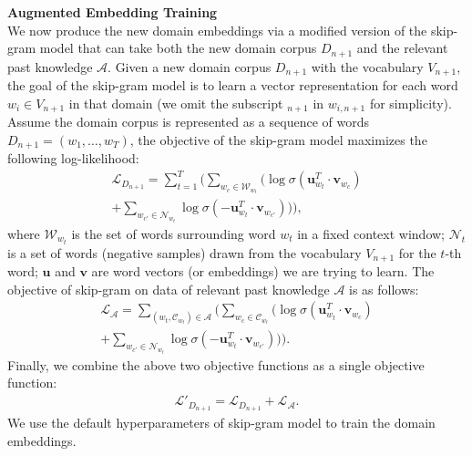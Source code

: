 \textbf{Augmented Embedding Training}\\
\label{chap3:sec:aet}
We now produce the new domain embeddings via a modified version of the skip-gram model \cite{mikolov2013distributed} that can take both the new domain corpus $D_{n+1}$ and the relevant past knowledge $\mathcal{A}$.
Given a new domain corpus $D_{n+1}$ with the vocabulary $V_{n+1}$, the goal of the skip-gram model is to learn a vector representation for each word $w_{i} \in V_{n+1}$ in that domain
(we omit the subscript $_{n+1}$ in $w_{i, n+1}$ for simplicity).
Assume the domain corpus is represented as a sequence of words $D_{n+1}=(w_1, \dots, w_T)$, the objective of the skip-gram model maximizes the following log-likelihood:
\begin{equation}
\label{chap3:eq:sg}
\begin{split}
\mathcal{L}_{D_{n+1}} =\sum_{t=1}^{T} \big( \sum_{w_c \in \mathcal{W}_{w_{t}} } \big(\log \sigma (\bm{u}_{w_t}^T\cdot \bm{v}_{w_c}) \\
+ \sum_{w_{c'} \in \mathcal{N}_{w_t} } \log \sigma(-\bm{u}_{w_t}^T\cdot \bm{v}_{w_{c'}} ) \big) \big) , 
\end{split}
\end{equation}
where $\mathcal{W}_{w_t}$ is the set of words surrounding word $w_t$ in a fixed context window;
$\mathcal{N}_t$ is a set of words (negative samples) drawn from the vocabulary $V_{n+1}$ for the $t$-th word;
$\bm{u}$ and $\bm{v}$ are word vectors (or embeddings) we are trying to learn.
The objective of skip-gram on data of relevant past knowledge $\mathcal{A}$ is as follows:
\begin{equation}
\begin{split}
\mathcal{L}_{\mathcal{A}}=\sum_{(w_t, \mathcal{C}_{w_t} ) \in \mathcal{A}} \big( \sum_{w_c \in \mathcal{C}_{w_t}} \big( \log \sigma (\bm{u}_{w_t}^T\cdot \bm{v}_{w_c}) \\
+ \sum_{w_{c'} \in \mathcal{N}_{w_t} } \log \sigma(-\bm{u}_{w_t}^T\cdot \bm{v}_{w_{c'}} ) \big) \big).
\end{split}
\end{equation}
Finally, we combine the above two objective functions as a single objective function:\\
\begin{equation}
\begin{split}
\mathcal{L}'_{D_{n+1}}=\mathcal{L}_{D_{n+1}} + \mathcal{L}_{\mathcal{A}}.
\end{split}
\end{equation}
We use the default hyperparameters of skip-gram model \cite{mikolov2013distributed} to train the domain embeddings.


